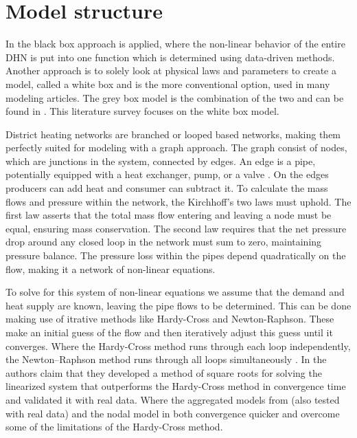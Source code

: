 \section{Model structure}
In \cite{GUELPA2016586}\cite{KECEBAS2012339} the black box approach is applied, where the non-linear behavior of the entire DHN is put into one function which is determined using data-driven methods. Another approach is to solely look at physical laws and parameters to create a model, called a white box and is the more conventional option, used in many modeling articles. The grey box model is the combination of the two and can be found in \cite{grey1}\cite{grey2}. This literature survey focuses on the white box model.

District heating networks are branched or looped based networks, making them perfectly suited for modeling with a graph approach. The graph consist of nodes, which are junctions in the system, connected by edges. An edge is a pipe, potentially equipped with a heat exchanger, pump, or a valve \cite{sibeijn2025economic}. On the edges producers can add heat and consumer can subtract it. To calculate the mass flows and pressure within the network, the Kirchhoff's two laws must uphold. The first law asserts that the total mass flow entering and leaving a node must be equal, ensuring mass conservation. The second law requires that the net pressure drop around any closed loop in the network must sum to zero, maintaining pressure balance. The pressure loss within the pipes depend quadratically on the flow, making it a network of non-linear equations.  

To solve for this system of non-linear equations we assume that the demand and heat supply are known, leaving the pipe flows to be determined. This can be done making use of itrative methods like Hardy-Cross and Newton-Raphson. These make an initial guess of the flow and then iteratively adjust this guess until it converges. Where the Hardy-Cross method runs through each loop independently, the Newton–Raphson method runs through all loops simultaneously \cite{NewtonenHard}. In \cite{STEVANOVIC} the authors claim that they developed a method of square roots for solving the linearized system that outperforms the Hardy-Cross method in convergence time and validated it with real data. Where the aggregated models from \cite{LARSEN2002995} (also tested with real data) and the nodal model in \cite{BENONYSSON1995297} both convergence quicker and overcome some of the limitations of the Hardy-Cross method.



